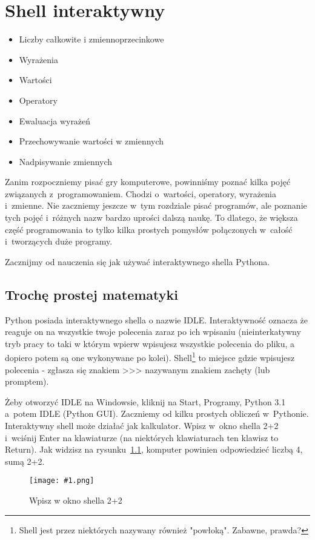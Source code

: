 \documentclass{book}
\newcommand{\img}[3]{
\begin{figure}
\centerline{
	\texttt{[image: \#1.png]}
}
\caption{#2}
\label{#1}
\end{figure}
}
\newcommand{\btopicscovered}{
	\begin{graybox}
	\begin{itemize}
}
\newcommand{\etopicscovered}{
	\end{itemize}
	\end{graybox}
}
\begin{document}
\chapter{Shell interaktywny}
\btopicscovered
	\item Liczby całkowite i zmiennoprzecinkowe
	\item Wyrażenia
	\item Wartości
	\item Operatory
	\item Ewaluacja wyrażeń
	\item Przechowywanie wartości w zmiennych
	\item Nadpisywanie zmiennych
\etopicscovered

Zanim rozpoczniemy pisać gry komputerowe, powinniśmy poznać kilka pojęć związanych z~programowaniem. Chodzi o~wartości, operatory, wyrażenia i~zmienne. Nie zaczniemy jeszcze w~tym rozdziale pisać programów, ale poznanie tych pojęć i~różnych nazw bardzo uprości dalszą naukę. To dlatego, że większa część programowania to tylko kilka prostych pomysłów połączonych w~całość i~tworzących duże programy.

Zacznijmy od nauczenia się jak używać interaktywnego shella Pythona.

\section{Trochę prostej matematyki}

Python posiada interaktywnego shella o nazwie IDLE. Interaktywność oznacza że reaguje on na wszystkie twoje polecenia zaraz po ich wpisaniu (nieinterkatywny tryb pracy to taki w którym wpierw wpisujesz wszystkie polecenia do pliku, a dopiero potem są one wykonywane po kolei). Shell\footnote{Shell jest przez niektórych nazywany również "powłoką". Zabawne, prawda?} to miejsce gdzie wpisujesz polecenia - zgłasza się znakiem >>> nazywanym znakiem zachęty (lub promptem).

Żeby otworzyć IDLE na Windowsie, kliknij na Start, Programy, Python 3.1 a~potem IDLE (Python GUI). Zaczniemy od kilku prostych obliczeń w~Pythonie. Interaktywny shell może działać jak kalkulator. Wpisz w~okno shella 2+2 i~wciśnij Enter na klawiaturze (na niektórych klawiaturach ten klawisz to Return). Jak widzisz na rysunku~\ref{idle-dwaplusdwa}, komputer powinien odpowiedzieć liczbą 4, sumą 2+2.

\img{idle-dwaplusdwa}{Wpisz w okno shella 2+2}{7cm}
\end{document}
